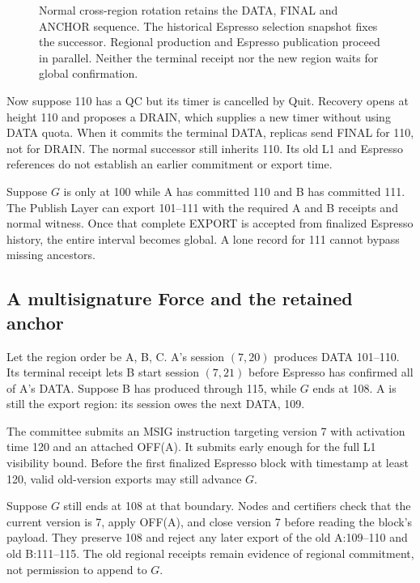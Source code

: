 \documentclass[11pt,a4paper]{article}
\begin{document}
\begin{figure}[htbp]\centering

\caption{Normal cross-region rotation retains the DATA, FINAL and
ANCHOR sequence. The historical Espresso selection snapshot fixes the
successor. Regional production and Espresso publication proceed in
parallel. Neither the terminal receipt nor the new region waits for
global confirmation.}
\label{fig:regular-cross-region}
\end{figure}
\FloatBarrier

Now suppose 110 has a QC but its timer is cancelled by Quit.
Recovery opens at height 110 and proposes a DRAIN, which supplies a
new timer without using DATA quota. When it commits the terminal DATA,
replicas send FINAL for 110, not for DRAIN. The normal successor still
inherits 110. Its old L1 and Espresso references do not establish an
earlier commitment or export time.

Suppose $G$ is only at 100 while A has committed 110 and B has committed
111. The Publish Layer can export 101--111 with the required A and B receipts
and normal witness. Once that complete EXPORT is accepted from finalized
Espresso history, the entire interval becomes global. A lone record for
111 cannot bypass missing ancestors.

\subsection{A multisignature Force and the retained anchor}
\label{sec:force-example}
Let the region order be A, B, C. A's session $(7,20)$ produces
DATA 101--110. Its terminal receipt lets B start session $(7,21)$
before Espresso has confirmed all of A's DATA. Suppose B has produced
through 115, while $G$ ends at 108. A is still the export region:
its session owes the next DATA, 109.

The committee submits an MSIG instruction targeting version 7 with
activation time 120 and an attached OFF(A). It submits early enough
for the full L1 visibility bound. Before the first finalized Espresso
block with timestamp at least 120, valid old-version exports may still
advance $G$.

Suppose $G$ still ends at 108 at that boundary. Nodes and certifiers
check that the current version is 7, apply OFF(A), and close version 7
before reading the block's payload. They preserve 108 and reject any
later export of the old A:109--110 and old B:111--115. The old regional
receipts remain evidence of regional commitment, not permission to
append to $G$.
\end{document}

